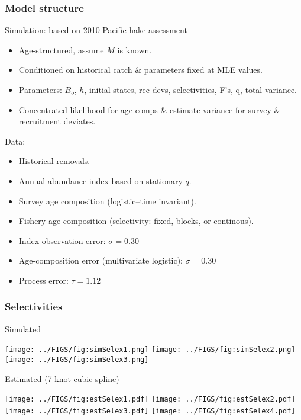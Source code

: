 \documentclass[table]{beamer}
\begin{document}
\begin{frame}[t]\frametitle{Model structure}
	Simulation: based on 2010 Pacific hake assessment
    \begin{itemize}
    	\item Age-structured, assume $M$ is known.
    	\item Conditioned on historical catch \& parameters fixed at MLE values.
    	\item Parameters: $B_o$, $h$, initial states, rec-devs, selectivities, F's, q, total variance.
    	\item Concentrated likelihood for age-comps \& estimate variance for survey \& recruitment deviates.
    \end{itemize}
    \vfill
    Data:
    \begin{itemize}
    	\item Historical removals.
    	\item Annual abundance index based on stationary $q$.
    	\item Survey age composition (logistic--time invariant).
    	\item Fishery age composition (selectivity: fixed, blocks, or continous).
    	\item Index observation error: $\sigma = 0.30$
    	\item Age-composition error (multivariate logistic): $\sigma = 0.30$
    	\item Process error: $\tau = 1.12$
    \end{itemize}
\end{frame}

\begin{frame}[t]\frametitle{Selectivities}
    Simulated
	\begin{center}
		\texttt{[image: ../FIGS/fig:simSelex1.png]}
		\texttt{[image: ../FIGS/fig:simSelex2.png]}
		\texttt{[image: ../FIGS/fig:simSelex3.png]}
	\end{center}
	\vspace{-1cm}
	Estimated (7 knot cubic spline)
	\begin{center}
		\texttt{[image: ../FIGS/fig:estSelex1.pdf]}\hspace{-1.4cm}
		\texttt{[image: ../FIGS/fig:estSelex2.pdf]}\hspace{-1.4cm}
		\texttt{[image: ../FIGS/fig:estSelex3.pdf]}\hspace{-1.4cm}
		\texttt{[image: ../FIGS/fig:estSelex4.pdf]}		
	\end{center}
\end{frame}
\end{document}

